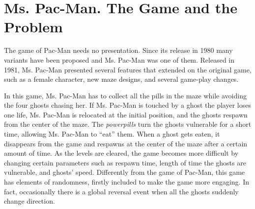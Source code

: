 \documentclass[a4paper]{llncs}
\begin{document}
%
%

\section{Ms. Pac-Man. The Game and the Problem}
\label{sec:mspacman_problem}

The game of Pac-Man needs no presentation. Since its release in 1980 many variants have been proposed and Ms. Pac-Man was one of them. Released in 1981, Ms. Pac-Man presented several features that extended on the original game, such as a female character, new maze designs, and several game-play changes.

In this game, Ms. Pac-Man has to collect all the pills in the maze while avoiding the four ghosts chasing her. If Ms. Pac-Man is touched by a ghost the player loses one life, Ms. Pac-Man is relocated at the initial position, and the ghosts respawn from the center of the maze. The {\em powerpills} turn the ghosts vulnerable for a short time, allowing Ms. Pac-Man to ``eat'' them. When a ghost gets eaten, it disappears from the game and respawns at the center of the maze after a certain amount of time. As the levels are cleared, the game becomes more difficult by changing certain parameters such as respawn time, length of time the ghosts are vulnerable, and ghosts' speed. Differently from the game of Pac-Man, this game has elements of randomness, firstly included to make the game more engaging. In fact, occasionally there is a global reversal event when all the ghosts suddenly change direction.
\end{document}
